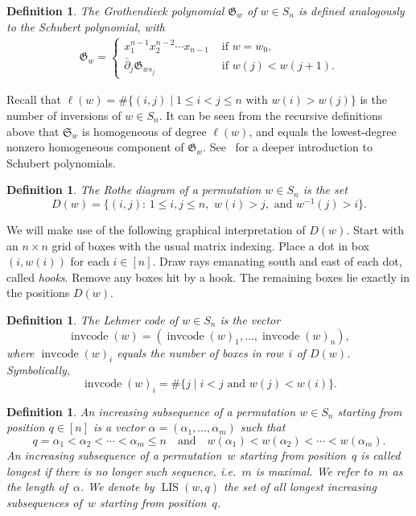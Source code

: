 \documentclass[10pt,a4paper]{amsart}
\DeclareMathOperator{\LIS}{\mathrm{LIS}}
\DeclareMathOperator{\cc}{\mathrm{invcode}}
\newtheorem{definition}[theorem]{Definition}
\begin{document}
\begin{definition}
	The \emph{Grothendieck polynomial} $\mathfrak{G}_w$ of $w\in S_n$ is defined analogously to the Schubert polynomial,
	with
	\begin{align*}
		\mathfrak{G}_w=\begin{cases}
			x_1^{n-1}x_2^{n-2}\cdots x_{n-1}&\mbox{ if } w=w_0,\\
			\overline{\partial}_j \mathfrak{G}_{ws_j} &\mbox{ if } w(j)<w(j+1).
		\end{cases}
	\end{align*}	
\end{definition}

Recall that $\ell(w)=\#\{(i,j)\mid 1\leq i<j\leq n \mbox{ with } w(i)>w(j) \}$ is the number of inversions of $w\in S_n$. It can be seen from the recursive definitions above that $\mathfrak{S}_w$ is homogeneous of degree $\ell(w)$, and equals the lowest-degree nonzero homogeneous component of $\mathfrak{G}_w$. See~\cite{manivel} for a deeper introduction to Schubert polynomials. 

\setcounter{section}{2}\setcounter{theorem}{3}
\begin{definition}
	The \emph{Rothe diagram} of a permutation $w\in S_n$ is the set
	\[D(w)=\{(i,j):\, 1\leq i,j\leq n,\,\, w(i)>j,\,\, \mbox{and } w^{-1}(j)>i \}.\]
\end{definition}

We will make use of the following graphical interpretation of $D(w)$. Start with an $n\times n$ grid of boxes with the usual matrix indexing. Place a dot in box $(i,w(i))$ for each $i\in [n]$. Draw rays emanating south and east of each dot, called \emph{hooks}. Remove any boxes hit by a hook. The remaining boxes lie exactly in the positions $D(w)$.

\begin{definition}
	The \emph{Lehmer code} of $w\in S_n$ is the vector
	\[\cc(w)=(\cc(w)_1,\ldots,\cc(w)_n),\]
	where $\cc(w)_i$ equals the number of boxes in row~$i$ of $D(w)$. Symbolically,
	\[\cc(w)_i = \#\{j\mid i<j\mbox{ and } w(j)<w(i) \}. \]
	
\end{definition}

\setcounter{section}{3}\setcounter{theorem}{0}
\begin{definition}\label{def:1}
	An \emph{increasing subsequence} of a permutation $w\in S_n$ starting from position $q\in [n]$ is a vector $\alpha=(\alpha_1,\ldots,\alpha_m)$ such that
	\[q=\alpha_1<\alpha_2<\cdots<\alpha_m\leq n \quad \mbox{and}\quad w(\alpha_1)<w(\alpha_2)<\cdots<w(\alpha_m).\] 
	An increasing subsequence of a permutation~$w$ starting from position~$q$ is called \emph{longest} if there is no longer such sequence, i.e.~$m$ is maximal. We refer to~$m$ as the \emph{length} of~$\alpha$. We denote by $\LIS(w,q)$ the set of all longest increasing subsequences of~$w$ starting from position~$q$.
\end{definition}
\end{document}
